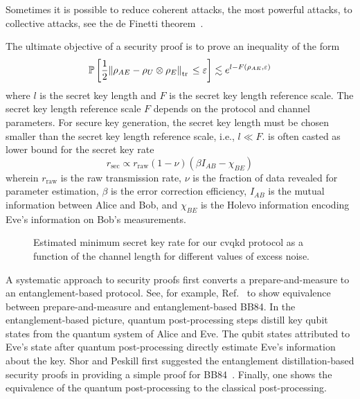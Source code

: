 Sometimes it is possible to reduce coherent attacks, the most powerful attacks, to collective attacks, see the de Finetti theorem~\cite[p.~148]{Wolf2021}.

The ultimate objective of a security proof is to prove an inequality of the form~\cite[p.~11]{Scarani2009}
\begin{equation}
	\mathbb{P}\left[
		\frac{1}{2}
		\norm{\rho_{AE}-\rho_U\otimes\rho_E}_{\trace{}}
		\leq
		\varepsilon
	\right]
	\lesssim
	e^{l-F(\rho_{AE},\varepsilon)}
	\label{eq:qkd_inequality}
\end{equation}
where $l$ is the secret key length and $F$ is the secret key length reference scale.
The secret key length reference scale $F$ depends on the protocol and channel parameters.
For secure key generation, the secret key length must be chosen smaller than the secret key length reference scale, i.e., $l\ll F$.
 is often casted as lower bound for the secret key rate~\cite{Brunner2017}
\begin{equation}
	r_\text{sec}
	\propto
	r_\text{raw}
	(1-\nu)
	(\beta I_{AB}-\chi_{BE})
\end{equation}
wherein $r_\text{raw}$ is the raw transmission rate, $\nu$ is the fraction of data revealed for parameter estimation, $\beta$ is the error correction efficiency, $I_{AB}$ is the mutual information between Alice and Bob, and $\chi_{BE}$ is the Holevo information encoding Eve's information on Bob's measurements.
\begin{figure}[htb]
	\centering
	
	\caption{Estimated minimum secret key rate for our \gls{cvqkd} protocol as a function of the channel length for different values of excess noise.}\label{fig:cvsim}
\end{figure}
A systematic approach to security proofs first converts a prepare-and-measure to an entanglement-based protocol.
See, for example, Ref.~\cite[p.~106]{Wolf2021} to show equivalence between prepare-and-measure and entanglement-based BB84.
In the entanglement-based picture, quantum post-processing steps distill key qubit states from the quantum system of Alice and Eve.
The qubit states attributed to Eve's state after quantum post-processing directly estimate Eve's information about the key.
Shor and Peskill first suggested the entanglement distillation-based security proofs in providing a simple proof for BB84~\cite{Shor2000}.
Finally, one shows the equivalence of the quantum post-processing to the classical post-processing.